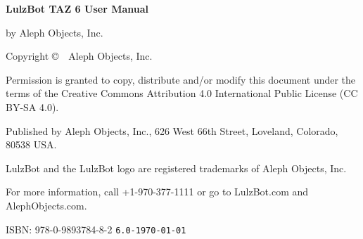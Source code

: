 %
%
%
%
%


\clearpage\null\vfill
\begingroup 
\thispagestyle{empty}
\footnotesize\raggedright
\setlength{\parskip}{0.5\baselineskip}

\textbf{LulzBot TAZ 6 User Manual}

by Aleph Objects, Inc.

Copyright \copyright\ \the\year\ Aleph Objects, Inc.\par
Permission is granted to copy, distribute and\slash or modify 
this document under the terms of the
Creative Commons Attribution 4.0 International Public License
(CC BY-SA 4.0).

Published by Aleph Objects, Inc., 626 West 66th Street, Loveland, Colorado, 80538 USA.

LulzBot\textsuperscript{\miniscule{\textregistered}} and the LulzBot logo are registered trademarks of Aleph Objects, Inc.

For more information, call +1-970-377-1111 or go to LulzBot.com and AlephObjects.com.

ISBN: 978-0-9893784-8-2
\renewcommand{\dateseparator}{}
\hfill\texttt{6.0-\yyyymmdddate\today} %
\endgroup
\pagebreak{}
